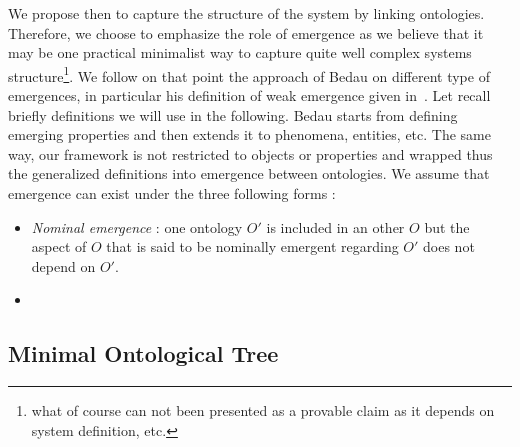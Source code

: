 We propose then to capture the structure of the system by linking ontologies. %
Therefore, we choose to emphasize the role of emergence as we believe that it may be one practical minimalist way to capture quite well complex systems structure\footnote{what of course can not been presented as a provable claim as it depends on system definition, etc.}. We follow on that point the approach of Bedau on different type of emergences, in particular his definition of weak emergence given in~\cite{bedau2002downward}. Let recall briefly definitions we will use in the following. Bedau starts from defining emerging properties and then extends it to phenomena, entities, etc. The same way, our framework is not restricted to objects or properties and wrapped thus the generalized definitions into emergence between ontologies. We assume that emergence can exist under the three following forms :
\begin{itemize}
\item \emph{Nominal emergence} : one ontology $O'$ is included in an other $O$ but the aspect of $O$ that is said to be nominally emergent regarding $O'$ does not depend on $O'$.
\item 

\end{itemize}


\begin{definition}

\end{definition}


\begin{definition}

\end{definition}




\subsection*{Minimal Ontological Tree}



